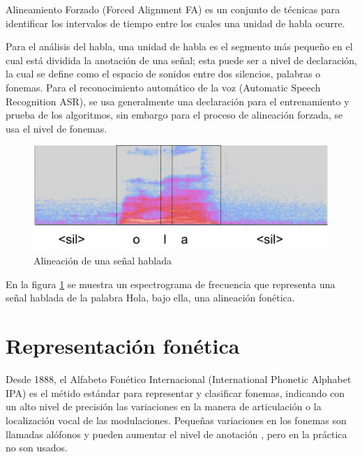 Alineamiento Forzado (Forced Alignment FA) es un conjunto de técnicas para identificar los intervalos de tiempo entre los cuales una unidad de habla ocurre.

Para el análisis del habla, una unidad de habla es el segmento más pequeño en el cual está dividida la anotación de una señal; esta puede ser a nivel de declaración, la cual se define como el espacio de sonidos entre dos silencios, palabras o fonemas. Para el reconocimiento automático de la voz (Automatic Speech Recognition ASR), se usa generalmente una declaración para el entrenamiento y prueba de los algoritmos, sin embargo para el proceso de alineación forzada, se usa el nivel de fonemas.

\begin{figure}[H]

\centering
\caption{Alineación de una señal hablada}
\label{img:alignment}
\includegraphics[scale=0.50]{images/alignment.png}
\end{figure}

En la figura \ref{img:alignment} se muestra un espectrograma de frecuencia que representa una señal hablada de la palabra Hola, bajo ella, una alineación fonética.

\section{Representación fonética}

Desde 1888, el Alfabeto Fonético Internacional (International Phonetic Alphabet IPA) es el métido estándar para representar y clasificar fonemas, indicando con un alto nivel de precisión las variaciones en la manera de articulación o la localización vocal de las modulaciones. Pequeñas variaciones en los fonemas son llamadas alófonos y pueden aumentar el nivel de anotación  \cite{IPAAlphabet}, pero en la práctica no son usados.

